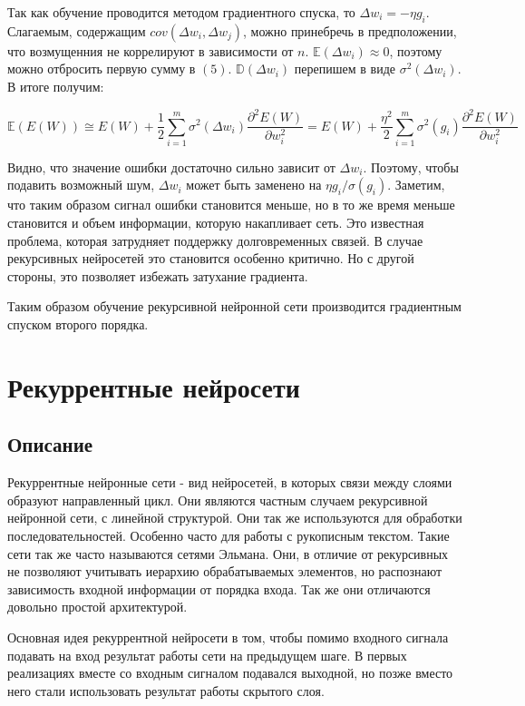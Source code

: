 \documentclass[14pt]{article}
\begin{document}
Так как обучение проводится методом градиентного спуска, то $\Delta w_i = -\eta g_i$.  Слагаемым, содержащим $cov(\Delta w_i, \Delta w_j)$, можно принебречь в предположении, что возмущенния не коррелируют в зависимости от $n$. $\mathbb{E}(\Delta w_i)\approx 0$, поэтому можно отбросить первую сумму в $(5)$. $\mathbb{D}(\Delta w_i)$ перепишем в виде $\sigma^2(\Delta w_i)$. В итоге получим:


\begin{equation}
\mathbb{E}(E(W)) \cong E(W) +
\frac{1}{2}\sum\limits_{i=1}^{m}\sigma^2(\Delta w_i)\frac{\partial^2E(W)}{\partial w_i^2} = E(W) + \frac{\eta^2}{2}\sum\limits_{i=1}^{m}\sigma^2(g_i)\frac{\partial^2E(W)}{\partial w_i^2}
\end{equation}


Видно, что значение ошибки достаточно сильно зависит от $\Delta w_i$. Поэтому, чтобы подавить возможный шум, $\Delta w_i$ может быть заменено на $\eta g_i / \sigma(g_i)$. Заметим, что таким образом сигнал ошибки становится меньше, но в то же время меньше становится и объем информации, которую накапливает сеть. Это известная проблема, которая затрудняет поддержку долговременных связей. В случае рекурсивных нейросетей это становится особенно критично. Но с другой стороны, это позволяет избежать затухание градиента.


Таким образом обучение рекурсивной нейронной сети производится градиентным спуском второго порядка.
\section{Рекуррентные нейросети}

\subsection{Описание}
Рекуррентные нейронные сети - вид нейросетей, в которых связи между слоями образуют направленный цикл. Они являются частным случаем рекурсивной нейронной сети, с линейной структурой. Они так же используются для обработки последовательностей. Особенно часто для работы с рукописным текстом. Такие сети так же часто называются сетями Эльмана. Они, в отличие от рекурсивных не позволяют учитывать иерархию обрабатываемых элементов, но распознают зависимость входной информации от порядка входа. Так же они отличаются довольно простой архитектурой.


Основная идея рекуррентной нейросети в том, чтобы помимо входного сигнала подавать на вход результат работы сети на предыдущем шаге. В первых реализациях вместе со входным сигналом подавался выходной, но позже вместо него стали использовать результат работы скрытого слоя.
\end{document}
